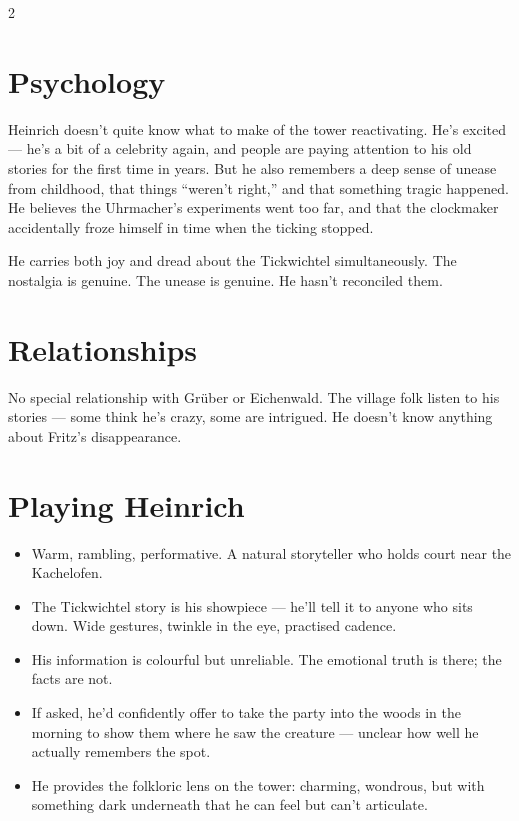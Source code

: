 \documentclass[10pt,letterpaper]{article}
\begin{document}
\begin{multicols}{2}
\section*{Psychology}
Heinrich doesn't quite know what to make of the tower reactivating. He's excited --- he's a bit of a celebrity again, and people are paying attention to his old stories for the first time in years. But he also remembers a deep sense of unease from childhood, that things ``weren't right,'' and that something tragic happened. He believes the Uhrmacher's experiments went too far, and that the clockmaker accidentally froze himself in time when the ticking stopped.

He carries both joy and dread about the Tickwichtel simultaneously. The nostalgia is genuine. The unease is genuine. He hasn't reconciled them.

\section*{Relationships}
No special relationship with Grüber or Eichenwald. The village folk listen to his stories --- some think he's crazy, some are intrigued. He doesn't know anything about Fritz's disappearance.

\section*{Playing Heinrich}
\begin{itemize}
\item Warm, rambling, performative. A natural storyteller who holds court near the Kachelofen.
\item The Tickwichtel story is his showpiece --- he'll tell it to anyone who sits down. Wide gestures, twinkle in the eye, practised cadence.
\item His information is colourful but unreliable. The emotional truth is there; the facts are not.
\item If asked, he'd confidently offer to take the party into the woods in the morning to show them where he saw the creature --- unclear how well he actually remembers the spot.
\item He provides the folkloric lens on the tower: charming, wondrous, but with something dark underneath that he can feel but can't articulate.
\end{itemize}

\end{multicols}

\newpage
\end{document}

